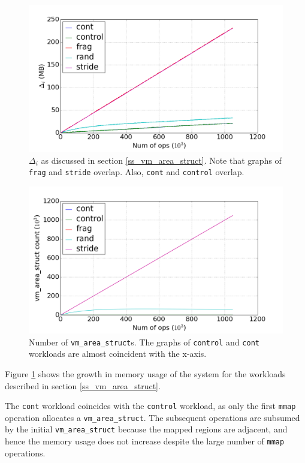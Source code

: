 \documentclass[twocolumn,11pt]{article}
\begin{document}
\begin{figure}[t]
    \includegraphics[width=\columnwidth]{figures/mmap_mem_usage}
    \caption{$\Delta_i$ as discussed in section \ref{ss_vm_area_struct}. Note that
    graphs of \texttt{frag} and \texttt{stride} overlap. Also, \texttt{cont} and
    \texttt{control} overlap.}
    \label{fig:mmap_mem_usage}
\end{figure}

\begin{figure}[t]
    \includegraphics[width=\columnwidth]{figures/vm_area_struct_count}
    \caption{Number of \texttt{vm\_area\_struct}s. The graphs of
    \texttt{control} and \texttt{cont} workloads are almost coincident with the
    x-axis.}
    \label{fig:vm_area_struct_count}
\end{figure}

Figure \ref{fig:mmap_mem_usage} shows the growth in memory usage of the system
for the workloads described in section \ref{ss_vm_area_struct}. 

The
\texttt{cont} workload coincides with the \texttt{control} workload, as only the
first \texttt{mmap} operation allocates a \texttt{vm\_area\_struct}. The subsequent
operations are subsumed by the initial \texttt{vm\_area\_struct} because the mapped
regions are adjacent, and hence the memory usage does not increase despite the
large number of \texttt{mmap} operations.  
\end{document}
